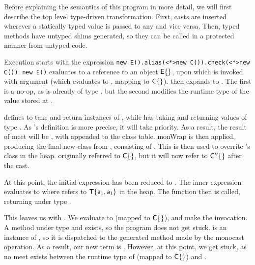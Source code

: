 \documentclass[sigconf]{acmart}
\newcommand{\code}[1]{{\tt #1}\xspace}
\begin{document}
Before explaining the semantics of this program in more detail, we will first
describe the top level type-driven transformation. First, casts are inserted
wherever a statically typed value is passed to any and vice versa. Then, typed
methods have untyped shims generated, so they can be called in a protected
manner from untyped code. 

Execution starts with the expression \code{new E().alias(<*>new
C()).check(<*>new C())}. \code{new E()} evaluates to a reference \a to an
object ${\sf{E}}\{\}$, upon which  is invoked with argument \New\C{}
(which evaluates to \a[1], mapping to $\C\{\}$).  then expands to
\MonCast{}. The first
\MonCast\C\a[1] is a no-op, as \a[1] is already of type \C, but the second
\MonCast\D\a[1] modifies the runtime type of the value stored at \a[1].

\D defines  to take and return instances of , while \C  has
 taking and returning values of type \any. As \D's definition is
more precise, it will take priority. As a result, the result of meet will be
\Cp, with \Class{} appended to the
class table. monWrap is then applied, producing the final new class \Cpp from
\Cp, consisting of \Class{}. This is then used to overrite \a[1]'s class in the heap. \a[1] originally
referred to $\C\{\}$, but it will now refer to ${\sf{C''}}\{\}$ after the cast.

At this point, the initial expression has been reduced to
. The inner expression
\any\any evaluates to
\any\any where \a[2] refers to $\xt{T}\{\a[1],\a[1]\}$
in the heap. The  function then is called, returning \a[1] under type
\any.

This leaves us with . We
evaluate \New\C{} to \a[3] (mapped to $\C\{\}$), and make the invocation. A
method  under type \any and \any exists, so the program does not get
stuck. \app is an instance of \Cpp, so it is dispatched to the generated
method  made by the monocast operation. As a result, our new term is
.
However, at this point, we get stuck, as no meet exists between the runtime type of
\a[3] (mapped to $\C\{\}$) and . 
 
\end{document}
